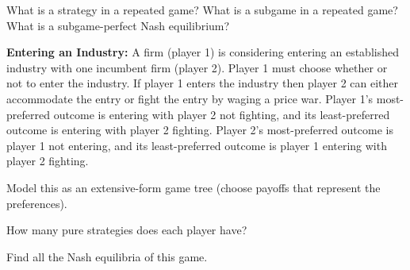 

What is a strategy in a repeated game? What is a subgame in a repeated game? What is a
subgame-perfect Nash equilibrium?
\resolespaco


\textbf{Entering an Industry:} A firm (player 1) is considering entering an established
industry with one incumbent firm (player 2). Player 1 must choose whether or not to enter the
industry. If player 1 enters the industry then player 2 can either accommodate the entry or fight
the entry by waging a price war. Player 1's most-preferred outcome is entering with player 2 not
fighting, and its least-preferred outcome is entering with player 2 fighting. Player 2's
most-preferred outcome is player 1 not entering, and its least-preferred outcome is player 1
entering with player 2 fighting.
\begin{partes}
\item Model this as an extensive-form game tree (choose payoffs that represent the preferences).
\item How many pure strategies does each player have?
\item Find all the Nash equilibria of this game.
\end{partes}
\resolespaco


